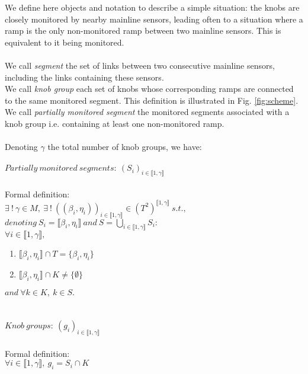 We define here objects and notation to describe a simple situation: the knobs are closely monitored by nearby mainline sensors, leading often to a situation where a ramp is the only non-monitored ramp between two mainline sensors. This is equivalent to it being monitored.\\
\\
We call \emph{segment} the set of links between two consecutive mainline sensors, including the links containing these sensors. \\
We call \emph{knob group} each set of knobs whose corresponding ramps are connected to the same monitored segment.
This definition is illustrated in Fig. \ref{fig:scheme}.\\
We call \emph{partially monitored segment} the monitored segments associated with a knob group i.e. containing at least one non-monitored ramp.\\
\\
Denoting $\gamma$ the total number of knob groups, we have:\\
\\
$Partially\ monitored\ segments:\ (S_{i})_{i \in \llbracket 1,\gamma \rrbracket}$\\ 
\\
Formal definition:\\
$\exists\ !\ \gamma\in M,\ \exists\ !\ ((\beta_{i},\eta_{i}))_{i\in\llbracket 1,\gamma\rrbracket}\in (T^2)^{\llbracket 1,\gamma\rrbracket}\ s.t.,$\\
$denoting\ S_{i}=\llbracket \beta_{i},\eta_{i} \rrbracket\ and\ S=\underset{i\in \llbracket 1,\gamma \rrbracket}{\bigcup}  S_{i}:$\\
$\forall i\in\llbracket 1,\gamma \rrbracket,$
\begin{enumerate}
	\item $\llbracket \beta_{i},\eta_{i} \rrbracket \cap T=\{\beta_{i},\eta_{i}\}$
	\item $\llbracket \beta_{i}, \eta_{i} \rrbracket \cap K\not= \{\emptyset \}$
\end{enumerate}
$and\ \forall k\in K,\ k\in S.$\\
\\
\\
$Knob\ groups:\ (g_{i})_{i\in \llbracket 1,\gamma \rrbracket}$\\
\\
Formal definition:\\
$\forall i \in \llbracket 1, \gamma \rrbracket,\ g_{i}=S_{i} \cap K $\\
\\
